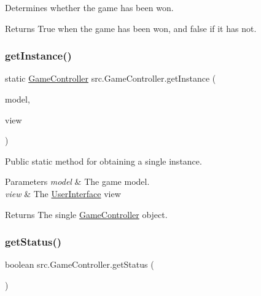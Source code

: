 Determines whether the game has been won. 

\begin{DoxyReturn}{Returns}
True when the game has been won, and false if it has not. 
\end{DoxyReturn}
\mbox{\label{classsrc_1_1GameController_a16d38d4e6e0e349e3455b2f9ec24d275}} 
\subsubsection{\texorpdfstring{get\+Instance()}{getInstance()}}
{\footnotesize\ttfamily static \hyperlink{classsrc_1_1GameController}{Game\+Controller} src.\+Game\+Controller.\+get\+Instance (\begin{DoxyParamCaption}\item[{\hyperlink{classsrc_1_1BoardT}{BoardT}}]{model,  }\item[{\hyperlink{classsrc_1_1UserInterface}{User\+Interface}}]{view }\end{DoxyParamCaption})\hspace{0.3cm}{\ttfamily [static]}}



Public static method for obtaining a single instance. 


\begin{DoxyParams}{Parameters}
{\em model} & The game model. \\
\hline
{\em view} & The \hyperlink{classsrc_1_1UserInterface}{User\+Interface} view \\
\hline
\end{DoxyParams}
\begin{DoxyReturn}{Returns}
The single \hyperlink{classsrc_1_1GameController}{Game\+Controller} object. 
\end{DoxyReturn}
\mbox{\label{classsrc_1_1GameController_adc7871ab4e7d684ff7c2f81e60b5eef0}} 
\subsubsection{\texorpdfstring{get\+Status()}{getStatus()}}
{\footnotesize\ttfamily boolean src.\+Game\+Controller.\+get\+Status (\begin{DoxyParamCaption}{ }\end{DoxyParamCaption})}




